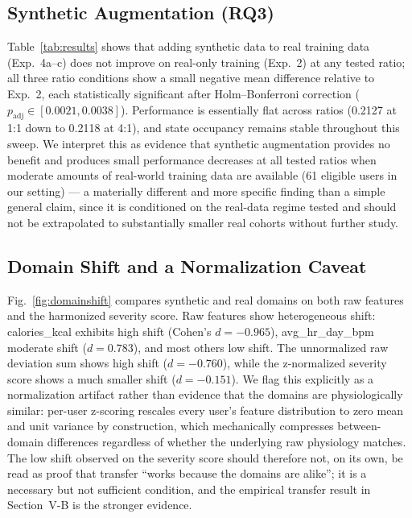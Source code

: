 \documentclass[conference]{IEEEtran}
\begin{document}
\subsection{Synthetic Augmentation (RQ3)}

Table~\ref{tab:results} shows that adding synthetic data to real training data (Exp.~4a--c) does not improve on real-only training (Exp.~2) at any tested ratio; all three ratio conditions show a small negative mean difference relative to Exp.~2, each statistically significant after Holm--Bonferroni correction ($p_{\text{adj}} \in [0.0021, 0.0038]$). Performance is essentially flat across ratios (0.2127 at 1:1 down to 0.2118 at 4:1), and state occupancy remains stable throughout this sweep. We interpret this as evidence that synthetic augmentation provides no benefit and produces small performance decreases at all tested ratios when moderate amounts of real-world training data are available (61 eligible users in our setting) --- a materially different and more specific finding than a simple general claim, since it is conditioned on the real-data regime tested and should not be extrapolated to substantially smaller real cohorts without further study.

\subsection{Domain Shift and a Normalization Caveat}

Fig.~\ref{fig:domainshift} compares synthetic and real domains on both raw features and the harmonized severity score. Raw features show heterogeneous shift: calories\_kcal exhibits high shift (Cohen's $d{=}{-}0.965$), avg\_hr\_day\_bpm moderate shift ($d{=}0.783$), and most others low shift. The unnormalized raw deviation sum shows high shift ($d{=}{-}0.760$), while the z-normalized severity score shows a much smaller shift ($d{=}{-}0.151$). We flag this explicitly as a normalization artifact rather than evidence that the domains are physiologically similar: per-user z-scoring rescales every user's feature distribution to zero mean and unit variance by construction, which mechanically compresses between-domain differences regardless of whether the underlying raw physiology matches. The low shift observed on the severity score should therefore not, on its own, be read as proof that transfer ``works because the domains are alike''; it is a necessary but not sufficient condition, and the empirical transfer result in Section~V-B is the stronger evidence.
\end{document}
